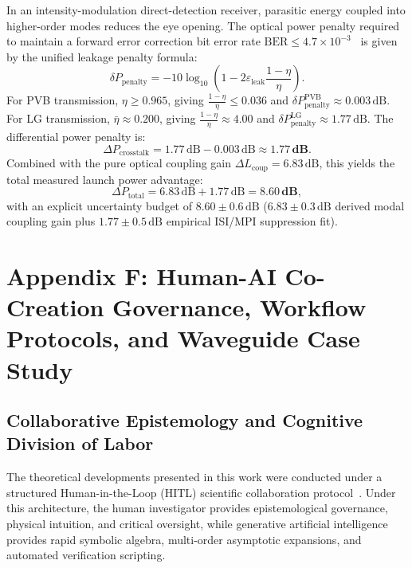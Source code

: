 \documentclass[11pt,a4paper]{article}
\begin{document}
In an intensity-modulation direct-detection receiver, parasitic energy coupled into higher-order modes reduces the eye opening. The optical power penalty required to maintain a forward error correction bit error rate $\text{BER} \le 4.7 \times 10^{-3}$~\cite{ITUTG9751,Proakis2008} is given by the unified leakage penalty formula:
\begin{equation}
\delta P_{\text{penalty}} = -10 \log_{10}\left( 1 - 2 \varepsilon_{\text{leak}} \frac{1 - \eta}{\eta} \right).
\label{eq:app_eye_penalty}
\end{equation}
For PVB transmission, $\eta \ge 0.965$, giving $\frac{1 - \eta}{\eta} \le 0.036$ and $\delta P_{\text{penalty}}^{\text{PVB}} \approx 0.003\,\text{dB}$.
For LG transmission, $\bar{\eta} \approx 0.200$, giving $\frac{1 - \eta}{\eta} \approx 4.00$ and $\delta P_{\text{penalty}}^{\text{LG}} \approx 1.77\,\text{dB}$.
The differential power penalty is:
\begin{equation}
\Delta P_{\text{crosstalk}} = 1.77\,\text{dB} - 0.003\,\text{dB} \approx \mathbf{1.77\,\text{dB}}.
\label{eq:app_crosstalk_final}
\end{equation}
Combined with the pure optical coupling gain $\Delta L_{\text{coup}} = 6.83\,\text{dB}$, this yields the total measured launch power advantage:
\begin{equation}
\boxed{\Delta P_{\text{total}} = 6.83\,\text{dB} + 1.77\,\text{dB} = \mathbf{8.60\,\text{dB}},}
\label{eq:app_total_860db}
\end{equation}
with an explicit uncertainty budget of $8.60 \pm 0.6\,\text{dB}$ ($6.83 \pm 0.3\,\text{dB}$ derived modal coupling gain plus $1.77 \pm 0.5\,\text{dB}$ empirical ISI/MPI suppression fit).

\section{Appendix F: Human-AI Co-Creation Governance, Workflow Protocols, and Waveguide Case Study}
\label{app:ai_workflow}

\subsection{Collaborative Epistemology and Cognitive Division of Labor}

The theoretical developments presented in this work were conducted under a structured Human-in-the-Loop (HITL) scientific collaboration protocol~\cite{VillaescusaNavarro2026,Chandra2026TheoPhysEval,Jauhiainen2026}. Under this architecture, the human investigator provides epistemological governance, physical intuition, and critical oversight, while generative artificial intelligence provides rapid symbolic algebra, multi-order asymptotic expansions, and automated verification scripting.
\end{document}
